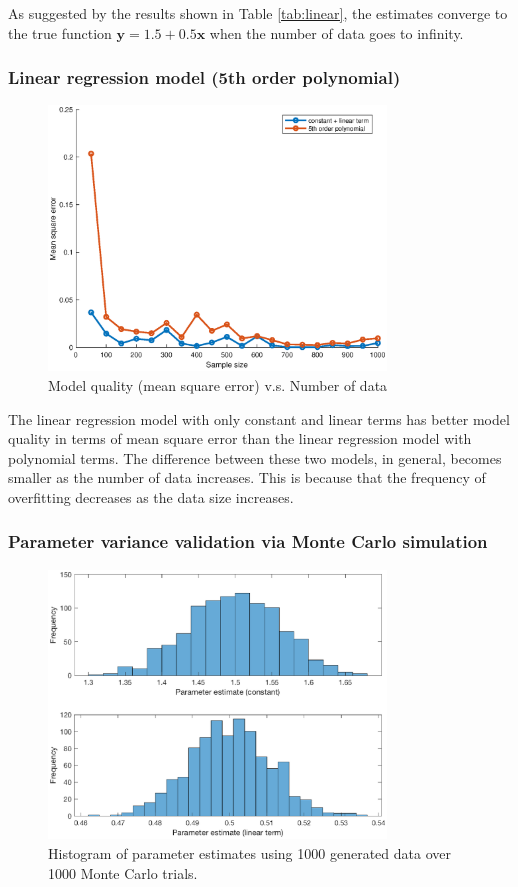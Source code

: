 \documentclass[]{article}
\begin{document}
As suggested by the results shown in Table \ref{tab:linear}, the estimates converge to the true function $\mathbf{y}=1.5+0.5\mathbf{x}$ when the number of data goes to infinity. 

\subsubsection{Linear regression model (5th order polynomial)}
\begin{figure}[H]
	\caption{Model quality (mean square error) v.s. Number of data}
	\centering
	\includegraphics[width=0.8\textwidth]{project3c}
\end{figure}

The linear regression model with only constant and linear terms has better model quality in terms of mean square error than the linear regression model with polynomial terms. The difference between these two models, in general, becomes smaller as the number of data increases. This is because that the frequency of overfitting decreases as the data size increases. 


\subsubsection{Parameter variance validation via Monte Carlo simulation}
\begin{figure}[H]
	\caption{Histogram of parameter estimates using 1000 generated data over 1000 Monte Carlo trials.}
	\centering
	\includegraphics[width=0.8\textwidth]{project3c2}
\end{figure}
\end{document}
